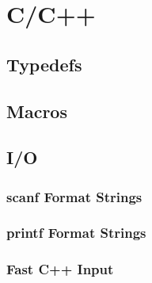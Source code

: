\section{C/C++}

\subsection{Typedefs}


\subsection{Macros}


\subsection{I/O}

\subsubsection{scanf Format Strings}


\subsubsection{printf Format Strings}



\subsubsection{Fast C++ Input}

